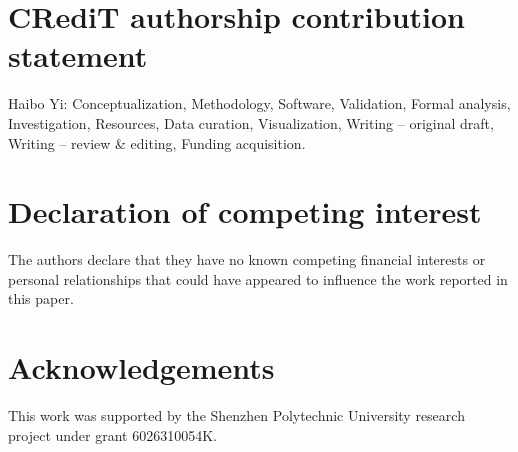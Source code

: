 \documentclass[preprint,12pt]{elsarticle}
\begin{document}
\section*{CRediT authorship contribution statement}
Haibo Yi: Conceptualization, Methodology, Software, Validation, Formal analysis, Investigation, Resources, Data curation, Visualization, Writing -- original draft, Writing -- review \& editing, Funding acquisition.

\section*{Declaration of competing interest}
The authors declare that they have no known competing financial interests or personal relationships that could have appeared to influence the work reported in this paper.

\section*{Acknowledgements}
{\small This work was supported by the Shenzhen Polytechnic University
research project under grant 6026310054K.}
\end{document}
